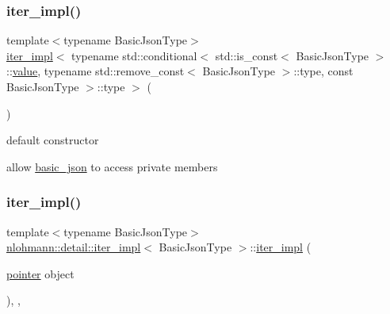 \subsubsection{\texorpdfstring{iter\+\_\+impl()}{iter\_impl()}\hspace{0.1cm}{\footnotesize\ttfamily [1/4]}}
{\footnotesize\ttfamily template$<$typename Basic\+Json\+Type$>$ \\
\mbox{\hyperlink{classnlohmann_1_1detail_1_1iter__impl}{iter\+\_\+impl}}$<$ typename std\+::conditional$<$ std\+::is\+\_\+const$<$ Basic\+Json\+Type $>$\+::\mbox{\hyperlink{classnlohmann_1_1detail_1_1iter__impl_ab447c50354c6611fa2ae0100ac17845c}{value}}, typename std\+::remove\+\_\+const$<$ Basic\+Json\+Type $>$\+::type, const Basic\+Json\+Type $>$\+::type $>$ (\begin{DoxyParamCaption}{ }\end{DoxyParamCaption})\hspace{0.3cm}{\ttfamily [default]}}



default constructor 

allow \mbox{\hyperlink{classnlohmann_1_1basic__json}{basic\+\_\+json}} to access private members \mbox{\label{classnlohmann_1_1detail_1_1iter__impl_a88a00484ac201c52fc5f613d88a2918b}} 
\subsubsection{\texorpdfstring{iter\+\_\+impl()}{iter\_impl()}\hspace{0.1cm}{\footnotesize\ttfamily [2/4]}}
{\footnotesize\ttfamily template$<$typename Basic\+Json\+Type$>$ \\
\mbox{\hyperlink{classnlohmann_1_1detail_1_1iter__impl}{nlohmann\+::detail\+::iter\+\_\+impl}}$<$ Basic\+Json\+Type $>$\+::\mbox{\hyperlink{classnlohmann_1_1detail_1_1iter__impl}{iter\+\_\+impl}} (\begin{DoxyParamCaption}\item[{\mbox{\hyperlink{classnlohmann_1_1detail_1_1iter__impl_a69e52f890ce8c556fd68ce109e24b360}{pointer}}}]{object }\end{DoxyParamCaption})\hspace{0.3cm}{\ttfamily [inline]}, {\ttfamily [explicit]}, {\ttfamily [noexcept]}}



